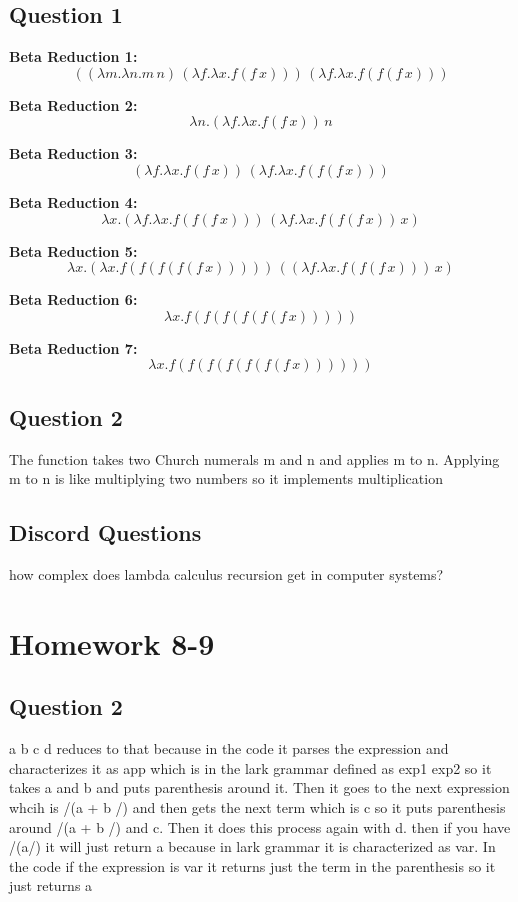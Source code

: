 \documentclass{article}
\theoremstyle{plain}
\theoremstyle{definition}
\theoremstyle{remark}
\begin{document}
\subsection{Question 1}

\textbf{Beta Reduction 1:}
\[
((\lambda m. \lambda n. m \, n) \, (\lambda f. \lambda x. f(f \, x))) \, (\lambda f. \lambda x. f(f(f \, x)))
\]

\textbf{Beta Reduction 2:}
\[
\lambda n. (\lambda f. \lambda x. f(f \, x)) \, n
\]

\textbf{Beta Reduction 3:}
\[
(\lambda f. \lambda x. f(f \, x)) \, (\lambda f. \lambda x. f(f(f \, x)))
\]

\textbf{Beta Reduction 4:}
\[
\lambda x. (\lambda f. \lambda x. f(f(f \, x))) \, (\lambda f. \lambda x. f(f(f \, x)) \, x)
\]

\textbf{Beta Reduction 5:}
\[
\lambda x. (\lambda x. f(f(f(f(f \, x))))) \, ((\lambda f. \lambda x. f(f(f \, x))) \, x)
\]

\textbf{Beta Reduction 6:}
\[
\lambda x. f(f(f(f(f(f \, x)))))
\]

\textbf{Beta Reduction 7:}
\[
\lambda x. f(f(f(f(f(f(f \, x))))))
\]


\subsection{Question 2}

The function takes two Church numerals m and n and applies m to n. Applying m to n is like multiplying two numbers so it implements multiplication

\subsection{Discord Questions}

how complex does lambda calculus recursion get in computer systems?


\section{Homework 8-9}\label{homework89}

\subsection{Question 2}

  a b c d reduces to that because in the code it parses the expression and characterizes it as app which is in the lark grammar defined as exp1 exp2 so it takes a and b and puts parenthesis around it. Then it goes to the next expression whcih is /(a + b /) and then gets the next term which is c so it puts parenthesis around /(a + b /) and c. Then it does this process again with d. then if you have /(a/) it will just return a because in lark grammar it is characterized as var. In the code if the expression is var it returns just the term in the parenthesis so it just returns a
\end{document}

